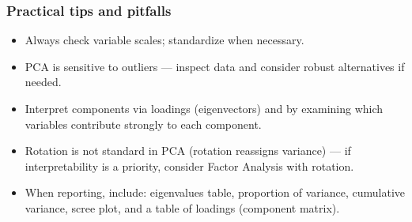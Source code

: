 \documentclass[aspectratio=169]{beamer}
\begin{document}
\begin{frame}
\frametitle{Practical tips and pitfalls}
\begin{itemize}
    \item Always check variable scales; standardize when necessary. \pause
    \item PCA is sensitive to outliers — inspect data and consider robust alternatives if needed. \pause
    \item Interpret components via loadings (eigenvectors) and by examining which variables contribute strongly to each component. \pause
    \item Rotation is not standard in PCA (rotation reassigns variance) — if interpretability is a priority, consider Factor Analysis with rotation. \pause
    \item When reporting, include: eigenvalues table, proportion of variance, cumulative variance, scree plot, and a table of loadings (component matrix). \pause
\end{itemize}
\end{frame}
\end{document}
